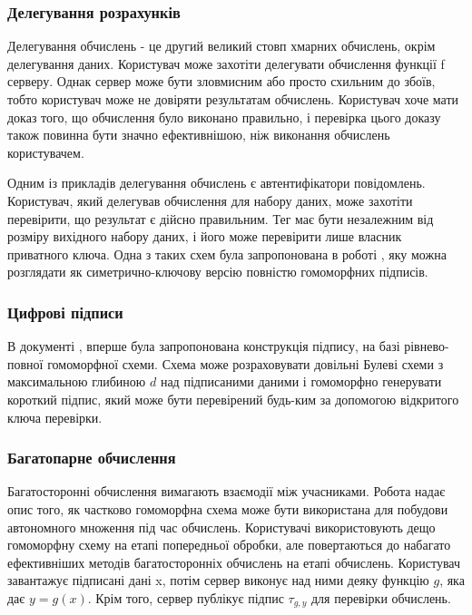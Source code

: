 \subsubsection*{Делегування розрахунків}
Делегування обчислень - це другий великий стовп хмарних обчислень, окрім делегування даних.
Користувач може захотіти делегувати обчислення функції f серверу. Однак сервер може бути
зловмисним або просто схильним до збоїв, тобто користувач може не довіряти результатам
обчислень. Користувач хоче мати доказ того, що обчислення було виконано правильно, і перевірка
цього доказу також повинна бути значно ефективнішою, ніж виконання обчислень користувачем.


Одним із прикладів делегування обчислень є автентифікатори повідомлень. Користувач, який
делегував обчислення для набору даних, може захотіти перевірити, що
результат є дійсно правильним. Тег має бути незалежним від розміру вихідного набору даних, і
його може перевірити лише власник приватного ключа. Одна з таких схем була запропонована в
роботі \cite{10.1007/978-3-642-42045-0_16}, яку можна розглядати як симетрично-ключову версію
повністю гомоморфних підписів.

\subsubsection*{Цифрові підписи}
В документі \cite{cryptoeprint:2014/897}, вперше була запропонована конструкція підпису, 
на базі рівнево-повної гомоморфної схеми. Схема може розраховувати довільні Булеві схеми з
максимальною глибиною \(d\) над підписаними даними і гомоморфно генерувати короткий підпис,
який може бути перевірений будь-ким за допомогою відкритого ключа перевірки. 

\subsubsection*{Багатопарне обчислення}

Багатосторонні обчислення вимагають взаємодії між учасниками. Робота 
\cite{cryptoeprint:2011/535} надає опис того, як частково гомоморфна схема може бути
використана для побудови автономного множення під час обчислень. Користувачі використовують
дещо гомоморфну схему на етапі попередньої обробки, але повертаються до набагато ефективніших
методів багатосторонніх обчислень на етапі обчислень. Користувач завантажує підписані дані x,
потім сервер виконує над ними деяку функцію \(g\), яка дає \(y = g(x)\). Крім того, сервер
публікує підпис \(\tau_{g,y}\) для перевірки обчислень.

